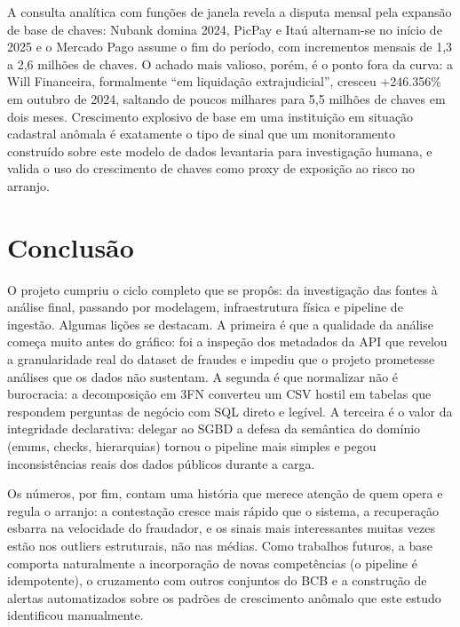 \documentclass[12pt,a4paper]{article}
\begin{document}
A consulta analítica com funções de janela revela a disputa mensal pela
expansão de base de chaves: Nubank domina 2024, PicPay e Itaú alternam-se no
início de 2025 e o Mercado Pago assume o fim do período, com incrementos
mensais de 1,3 a 2,6 milhões de chaves. O achado mais valioso, porém, é o
ponto fora da curva: a Will Financeira, formalmente ``em liquidação
extrajudicial'', cresceu +246.356\% em outubro de 2024, saltando de
poucos milhares para 5,5 milhões de chaves em dois meses. Crescimento
explosivo de base em uma instituição em situação cadastral anômala é
exatamente o tipo de sinal que um monitoramento construído sobre este
modelo de dados levantaria para investigação humana, e valida o uso do
crescimento de chaves como proxy de exposição ao risco no arranjo.

\section{Conclusão}

O projeto cumpriu o ciclo completo que se propôs: da investigação das
fontes à análise final, passando por modelagem, infraestrutura física e
pipeline de ingestão. Algumas lições se destacam. A primeira é que a
qualidade da análise começa muito antes do gráfico: foi a inspeção
dos metadados da API que revelou a granularidade real do dataset
de fraudes e impediu que o projeto prometesse análises que os dados não
sustentam. A segunda é que normalizar não é burocracia: a decomposição em
3FN converteu um CSV hostil em tabelas que respondem perguntas de negócio
com SQL direto e legível. A terceira é o valor da integridade declarativa:
delegar ao SGBD a defesa da semântica do domínio (enums, checks,
hierarquias) tornou o pipeline mais simples e pegou inconsistências reais
dos dados públicos durante a carga.

Os números, por fim, contam uma história que merece atenção de quem opera e
regula o arranjo: a contestação cresce mais rápido que o sistema, a
recuperação esbarra na velocidade do fraudador, e os sinais mais
interessantes muitas vezes estão nos outliers estruturais, não nas
médias. Como trabalhos futuros, a base comporta naturalmente a incorporação
de novas competências (o pipeline é idempotente), o cruzamento com outros
conjuntos do BCB e a construção de alertas automatizados sobre os padrões
de crescimento anômalo que este estudo identificou manualmente.
\end{document}
